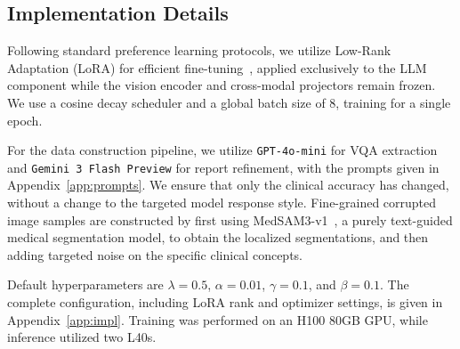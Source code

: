\subsection{Implementation Details}
\label{sec:exp:impl}

Following standard preference learning protocols, we utilize Low-Rank Adaptation (LoRA) for efficient fine-tuning~\cite{hu2022lora}, applied exclusively to the LLM component while the vision encoder and cross-modal projectors remain frozen. We use a cosine decay scheduler and a global batch size of $8$, training for a single epoch.

For the data construction pipeline, we utilize \texttt{GPT-4o-mini} for VQA extraction and \texttt{Gemini 3 Flash Preview} for report refinement, with the prompts given in Appendix~\ref{app:prompts}. We ensure that only the clinical accuracy has changed, without a change to the targeted model response style. Fine-grained corrupted image samples are constructed by first using MedSAM3-v1~\cite{liu2025medsam3}, a purely text-guided medical segmentation model, to obtain the localized segmentations, and then adding targeted noise on the specific clinical concepts.

Default hyperparameters are $\lambda = 0.5$, $\alpha = 0.01$, $\gamma = 0.1$, and $\beta = 0.1$. The complete configuration, including LoRA rank and optimizer settings, is given in Appendix~\ref{app:impl}. Training was performed on an H100 80GB GPU, while inference utilized two L40s.
